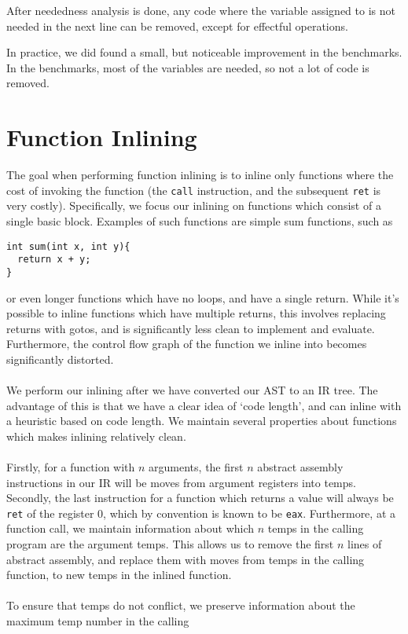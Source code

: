 \documentclass[11pt]{article}
\begin{document}
After neededness analysis is done, any code where the variable assigned to is
not needed in the next line can be removed, except for effectful operations.

In practice, we did found a small, but noticeable improvement in the benchmarks.
In the benchmarks, most of the variables are needed, so not a lot of code is
removed.

\section{Function Inlining}
The goal when performing function inlining is to inline only functions where the cost of
invoking the function (the \verb+call+ instruction, and the subsequent \verb+ret+ is very
costly). Specifically, we focus our inlining on functions which consist of a single basic
block. Examples of such functions are simple sum functions, such as
\begin{verbatim}
int sum(int x, int y){
  return x + y;
}
\end{verbatim}
or even longer functions which have no loops, and have a single return. While it's possible to inline
functions which have multiple returns, this involves replacing returns with gotos, and is
significantly less clean to implement and evaluate. Furthermore, the control flow graph of
the function we inline into becomes significantly distorted. \\
\\
We perform our inlining after we have converted our AST to an IR tree. The advantage of this is that
we have a clear idea of `code length', and can inline with a heuristic based on code length. We maintain
several properties about functions which makes inlining relatively clean. \\
\\
Firstly, for a function with $n$ arguments, the first $n$ abstract assembly instructions in our IR will
be moves from argument registers into temps. Secondly, the last instruction for a function which returns a
value will always be \verb+ret+ of the register 0, which by convention is known to be \verb+eax+. Furthermore,
at a function call, we maintain information about which $n$ temps in the calling program are the argument
temps. This allows us to remove the first $n$ lines of abstract assembly, and replace them with moves from
temps in the calling function, to new temps in the inlined function.\\
\\
To ensure that temps do not conflict, we preserve information about the maximum temp number in the calling
\end{document}

